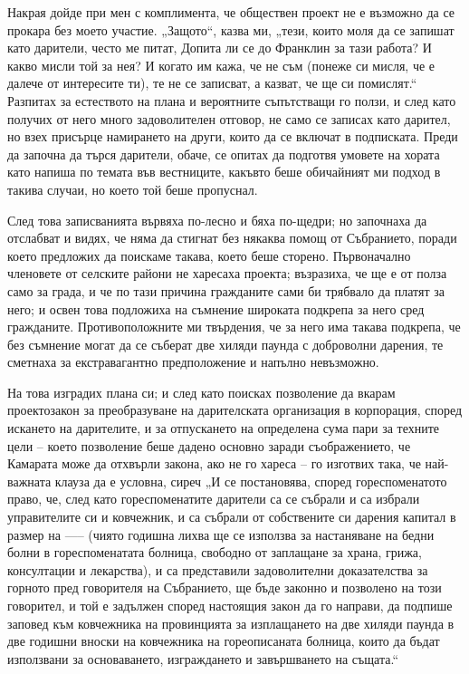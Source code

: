 \documentclass[12pt]{book}
\begin{document}
Накрая дойде при мен с комплимента, че обществен проект не е възможно да се прокара без моето участие. „Защото“, казва ми, „тези, които моля да се запишат като дарители, често ме питат, Допита ли се до Франклин за тази работа? И какво мисли той за нея? И когато им кажа, че не съм (понеже си мисля, че е далече от интересите ти), те не се записват, а казват, че ще си помислят.“ Разпитах за естеството на плана и вероятните съпътстващи го ползи, и след като получих от него много задоволителен отговор, не само се записах като дарител, но взех присърце намирането на други, които да се включат в подписката. Преди да започна да търся дарители, обаче, се опитах да подготвя умовете на хората като напиша по темата във вестниците, какъвто беше обичайният ми подход в такива случаи, но което той беше пропуснал.

След това записванията вървяха по-лесно и бяха по-щедри; но започнаха да отслабват и видях, че няма да стигнат без някаква помощ от Събранието, поради което предложих да поискаме такава, което беше сторено. Първоначално членовете от селските райони не харесаха проекта; възразиха, че ще е от полза само за града, и че по тази причина гражданите сами би трябвало да платят за него; и освен това подложиха на съмнение широката подкрепа за него сред гражданите. Противоположните ми твърдения, че за него има такава подкрепа, че без съмнение могат да се съберат две хиляди паунда с доброволни дарения, те сметнаха за екстравагантно предположение и напълно невъзможно.

На това изградих плана си; и след като поисках позволение да вкарам проектозакон за преобразуване на дарителската организация в корпорация, според искането на дарителите, и за отпускането на определена сума пари за техните цели – което позволение беше дадено основно заради съображението, че Камарата може да отхвърли закона, ако не го хареса – го изготвих така, че най-важната клауза да е условна, сиреч „И се постановява, според гореспоменатото право, че, след като гореспоменатите дарители са се събрали и са избрали управителите си и ковчежник, и са събрали от собствените си дарения капитал в размер на ----- (чиято годишна лихва ще се използва за настаняване на бедни болни в гореспоменатата болница, свободно от заплащане за храна, грижа, консултации и лекарства), и са представили задоволителни доказателства за горното пред говорителя на Събранието, ще бъде законно и позволено на този говорител, и той е задължен според настоящия закон да го направи, да подпише заповед към ковчежника на провинцията за изплащането на две хиляди паунда в две годишни вноски на ковчежника на гореописаната болница, които да бъдат използвани за основаването, изграждането и завършването на същата.“ 
\end{document}
